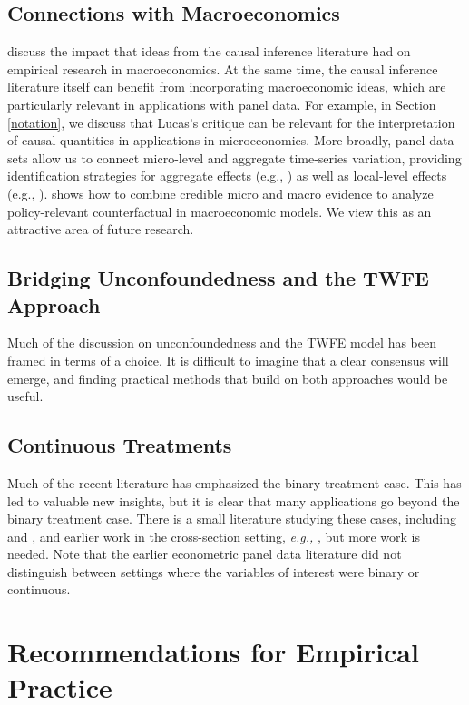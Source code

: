 \documentclass[letterpaper,12pt,leqno]{article}
\begin{document}
\subsection{Connections with Macroeconomics}
\citep{nakamura2018identification} discuss the impact that ideas from the causal inference literature had on empirical research in macroeconomics. At the same time, the causal inference literature itself can benefit from incorporating macroeconomic ideas, which are particularly relevant in applications with panel data. For example, in Section \ref{notation}, we discuss that Lucas's critique can be relevant for the interpretation of causal quantities in applications in microeconomics. More broadly, panel data sets allow us to connect micro-level and aggregate time-series variation, providing identification strategies for aggregate effects (e.g., \citealp{gabaix2020granular}) as well as local-level effects (e.g., \citealp{arkhangelsky2019policy}). \cite{wolf2023missing} shows how to combine credible micro and macro evidence to analyze policy-relevant counterfactual in macroeconomic models.  We view this as an attractive area of future research. 


\subsection{Bridging Unconfoundedness and the TWFE Approach}

Much of the discussion on unconfoundedness and the TWFE model has been framed in terms of a choice. It is difficult to imagine that a clear consensus will emerge, and finding practical methods that build on both approaches would be useful. 

    
 \subsection{Continuous Treatments}

Much of the recent literature has emphasized the binary treatment case. This has led to valuable new insights, but it is clear that many applications go beyond the binary treatment case. 
There is a small literature studying these cases, including
\citep{callaway2021difference} and \citep{de2023two}, and earlier work in the cross-section setting, {\it e.g.,} \citep{imbens2000}, but more work is needed. Note that the earlier econometric panel data literature did not distinguish between settings where the variables of interest were binary or continuous.


\section{Recommendations for Empirical Practice}\label{recommendations}
\end{document}
